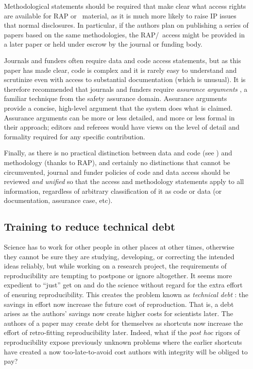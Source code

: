\documentclass{comjnl}
\begin{document}
Methodological statements should be required that make clear what access rights are available for RAP or \RAPstar\ material, as it is much more likely to raise IP issues that normal disclosures. In particular, if the authors plan on publishing a series of papers based on the same methodologies, the RAP/\RAPstar\ access might be provided in a later paper or held under escrow by the journal or funding body.

Journals and funders often require data and code access statements, but as this paper has made clear, code is complex and it is rarely easy to understand and scrutinize even with access to substantial documentation (which is unusual). It is therefore recommended that journals and funders require \emph{assurance arguments} \cite{assurance-case}, a familiar technique from the safety assurance domain. Assurance arguments provide a concise, high-level argument that the system does what is claimed. Assurance arguments can be more or less detailed, and more or less formal in their approach; editors and referees would have views on the level of detail and formality required for any specific contribution.

Finally, as there is no practical distinction between data and code (see \supplement) and methodology (thanks to RAP), and certainly no distinctions that cannot be circumvented, journal and funder policies of code and data access should be reviewed \emph{and unified\/} so that the access and methodology statements apply to all information, regardless of arbitrary classification of it as code or data (or documentation, assurance case, etc).

\subsection{Training to reduce technical debt}\label{technical-debt}
Science has to work for other people in other places at other times, otherwise they cannot be sure they are studying, developing, or correcting the intended ideas reliably, but while working on a research project, the requirements of reproducibility are tempting to postpone or ignore altogether. It seems more expedient to ``just'' get on and do the science without regard for the extra effort of ensuring reproducibility. This creates the problem known as \emph{technical debt} \cite{debt}: the savings in effort now increase the future cost of reproduction. That is, a debt arises as the authors' savings now create higher costs for scientists later. The authors of a paper may create debt for themselves as shortcuts now increase the effort of retro-fitting reproducibility later. Indeed, what if the \emph{post hoc\/} rigors of reproducibility expose previously unknown problems where the earlier shortcuts have created a now too-late-to-avoid cost authors with integrity will be obliged to pay?
\end{document}
